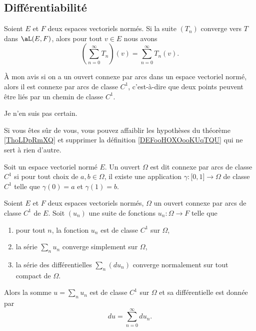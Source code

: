 \subsection{Différentiabilité}

\begin{lemma}
    Soient \( E\) et \( F\) deux espaces vectoriels normés. Si la suite \( (T_n)\) converge vers \( T\) dans \( \aL(E,F)\), alors pour tout \( v\in E\) nous avons
    \begin{equation}
        \left( \sum_{n=0}^{\infty}T_n \right)(v)=\sum_{n=0}^{\infty}T_n(v).
    \end{equation}
\end{lemma}

\begin{probleme}
    À mon avis si on a un ouvert connexe par arcs dans un espace vectoriel normé, alors il est connexe par arcs de classe \( C^1\), c'est-à-dire que deux points peuvent être liés par un chemin de classe \( C^1\).

    Je n'en suis pas certain.

    Si vous êtes sûr de vous, vous pouvez affaiblir les hypothèses du théorème \ref{ThoLDpRmXQ} et supprimer la définition \ref{DEFooHOXOooKUqTQU} qui ne sert à rien d'autre.
\end{probleme}

\begin{definition}      \label{DEFooHOXOooKUqTQU}
    Soit un espace vectoriel normé \( E\). Un ouvert \( \Omega\) est dit connexe par arcs de classe \( C^1\) si pour tout choix de \( a,b\in \Omega\), il existe une application \( \gamma\colon \mathopen[ 0 , 1 \mathclose]\to \Omega\) de classe \( C^1\) telle que \( \gamma(0)=a\) et \( \gamma(1)=b\).
\end{definition}

\begin{theorem} \label{ThoLDpRmXQ}
    Soient \( E\) et \( F\) deux espaces vectoriels normés, \( \Omega\) un ouvert connexe par arcs de classe \( C^1\) de \( E\). Soit \( (u_n)\) une suite de fonctions \( u_n\colon \Omega\to F\) telle que
    \begin{enumerate}
        \item
            pour tout \( n\), la fonction \( u_n\) est de classe \( C^1\) sur \( \Omega\),
        \item
            la série \( \sum_nu_n\) converge simplement sur \( \Omega\),
        \item
            la série des différentielles \( \sum_n(du_n)\) converge normalement sur tout compact de \( \Omega\).
    \end{enumerate}
    Alors la somme \( u=\sum_nu_n\) est de classe \( C^1\) sur \( \Omega\) et sa différentielle est donnée par
    \begin{equation}
        du=\sum_{n=0}^{\infty}du_n.
    \end{equation}
\end{theorem}

